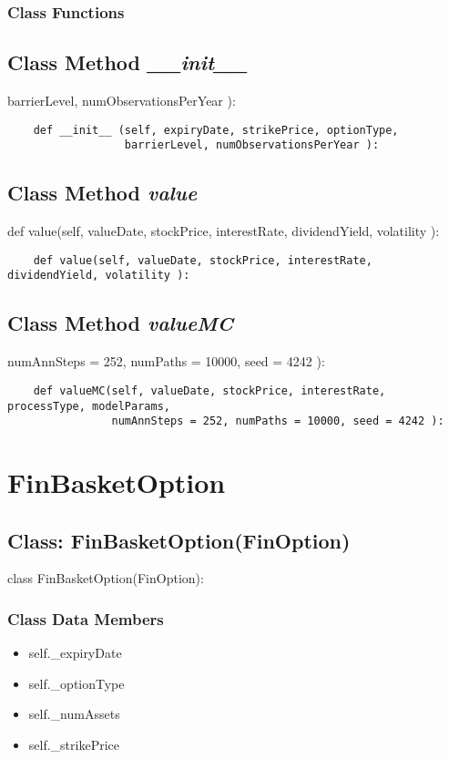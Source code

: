 \documentclass[twoside,11pt]{book}
\begin{document}
\subsubsection{Class Functions}

\subsection{Class Method {\it \_\_init\_\_ }}
barrierLevel, numObservationsPerYear ):

\begin{lstlisting}
    def __init__ (self, expiryDate, strikePrice, optionType, 
                  barrierLevel, numObservationsPerYear ):
\end{lstlisting}

\subsection{Class Method {\it value}}
def value(self, valueDate, stockPrice, interestRate, dividendYield, volatility ):

\begin{lstlisting}
    def value(self, valueDate, stockPrice, interestRate, dividendYield, volatility ):
\end{lstlisting}

\subsection{Class Method {\it valueMC}}
numAnnSteps = 252, numPaths = 10000, seed = 4242 ):

\begin{lstlisting}
    def valueMC(self, valueDate, stockPrice, interestRate, processType, modelParams, 
                numAnnSteps = 252, numPaths = 10000, seed = 4242 ):
\end{lstlisting}

\newpage
\section{FinBasketOption}

\subsection{Class: FinBasketOption(FinOption)}
class FinBasketOption(FinOption):

\subsubsection{Class Data Members}
\begin{itemize}
\item{self.\_expiryDate}
\item{self.\_optionType}
\item{self.\_numAssets}
\item{self.\_strikePrice}
\end{itemize}
\end{document}
